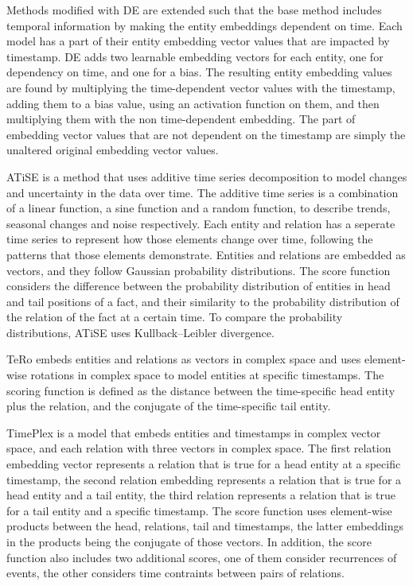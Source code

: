 Methods modified with DE \cite{goel19diachronicemb} are extended such that the base method includes temporal information by making the entity embeddings dependent on time.
Each model has a part of their entity embedding vector values that are impacted by timestamp.
DE adds two learnable embedding vectors for each entity, one for dependency on time, and one for a bias.
The resulting entity embedding values are found by multiplying the time-dependent vector values with the timestamp, adding them to a bias value, using an activation function on them, and then multiplying them with the non time-dependent embedding. 
The part of embedding vector values that are not dependent on the timestamp are simply the unaltered original embedding vector values.

ATiSE \cite{xu19atise} is a method that uses additive time series decomposition to model changes and uncertainty in the data over time. The additive time series is a combination of a linear function, a sine function and a random function, to describe trends, seasonal changes and noise respectively. Each entity and relation has a seperate time series to represent how those elements change over time, following the patterns that those elements demonstrate. Entities and relations are embedded as vectors, and they follow Gaussian probability distributions. The score function considers the difference between the probability distribution of entities in head and tail positions of a fact, and their similarity to the probability distribution of the relation of the fact at a certain time. To compare the probability distributions, ATiSE uses Kullback–Leibler divergence.

TeRo \cite{xu2020tero} embeds entities and relations as vectors in complex space and uses element-wise rotations in complex space to model entities at specific timestamps.
The scoring function is defined as the distance between the time-specific head entity plus the relation, and the conjugate of the time-specific tail entity.

TimePlex \cite{jain2020timeplex} is a model that embeds entities and timestamps in complex vector space, and each relation with three vectors in complex space. The first relation embedding vector represents a relation that is true for a head entity at a specific timestamp, the second relation embedding represents a relation that is true for a head entity and a tail entity, the third relation represents a relation that is true for a tail entity and a specific timestamp. The score function uses element-wise products between the head, relations, tail and timestamps, the latter embeddings in the products being the conjugate of those vectors. In addition, the score function also includes two additional scores, one of them consider recurrences of events, the other considers time contraints between pairs of relations.